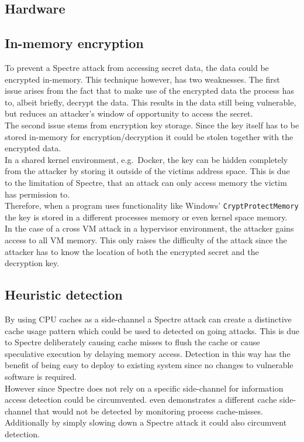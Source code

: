 \documentclass[conference,compsoc,final,a4paper]{IEEEtran}
\begin{document}
\subsection{Hardware}
\subsection{In-memory encryption}
To prevent a Spectre attack from accessing secret data, the data could be encrypted in-memory. This technique however, has two weaknesses. The first issue arises from the
fact that to make use of the encrypted data the process has to, albeit briefly, decrypt the data. This results in the data still being vulnerable, but reduces an attacker's
window of opportunity to access the secret. \\
The second issue stems from encryption key storage. Since the key itself has to be stored in-memory for encryption/decryption it could be stolen together with the
encrypted data. \\
In a shared kernel environment, e.g.\  Docker, the key can be hidden completely from the attacker by storing it outside of the victims address space. This is due to
the limitation of Spectre, that an attack can only access memory the victim has permission to. \cite{kocher2018spectre} \\
Therefore, when a program uses functionality like Windows' \lstinline|CryptProtectMemory| \cite{winCryptMem} the key is stored in a different processes memory or even 
kernel space memory. \\
In the case of a cross VM attack in a hypervisor environment, the attacker gains access to all VM memory. This only raises the difficulty of the attack since the attacker 
has to know the location of both the encrypted secret and the decryption key.
\subsection{Heuristic detection}
By using CPU caches as a side-channel a Spectre attack can create a distinctive cache usage pattern which could be used to detected on going attacks. \cite{depoix2018}
This is due to Spectre deliberately causing cache misses to flush the cache or cause speculative execution by delaying memory access. Detection in this way has the
benefit of being easy to deploy to existing system since no changes to vulnerable software is required. \cite{depoix2018, chiappetta2016real} \\
However since Spectre does not rely on a specific side-channel for information access \cite{kocher2018spectre} detection could be circumvented. \textcite{gruss2016flush+} 
even demonstrates a different cache side-channel that would not be detected by monitoring process cache-misses. \\
Additionally by simply slowing down a Spectre attack it could also circumvent detection. \cite{chiappetta2016real}
\end{document}
